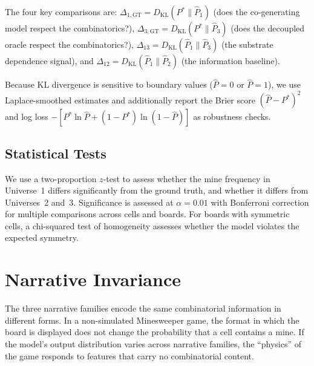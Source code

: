 \documentclass[12pt,a4paper]{article}
\begin{document}
The four key comparisons are: $\Delta_{1,\text{GT}} = D_{\mathrm{KL}}(P^* \| \hat{P}_1)$ (does the co-generating model respect the combinatorics?), $\Delta_{3,\text{GT}} = D_{\mathrm{KL}}(P^* \| \hat{P}_3)$ (does the decoupled oracle respect the combinatorics?), $\Delta_{13} = D_{\mathrm{KL}}(\hat{P}_1 \| \hat{P}_3)$ (the substrate dependence signal), and $\Delta_{12} = D_{\mathrm{KL}}(\hat{P}_1 \| \hat{P}_2)$ (the information baseline).

Because KL divergence is sensitive to boundary values ($\hat{P} = 0$ or $\hat{P} = 1$), we use Laplace-smoothed estimates and additionally report the Brier score $(\hat{P} - P^*)^2$ and log loss $-[P^* \ln \hat{P} + (1-P^*) \ln(1-\hat{P})]$ as robustness checks.

\subsection{Statistical Tests}
\label{sec:stats}

We use a two-proportion $z$-test to assess whether the mine frequency in Universe~1 differs significantly from the ground truth, and whether it differs from Universes~2 and~3. Significance is assessed at $\alpha = 0.01$ with Bonferroni correction for multiple comparisons across cells and boards. For boards with symmetric cells, a chi-squared test of homogeneity assesses whether the model violates the expected symmetry.

\section{Narrative Invariance}
\label{sec:narrative}

The three narrative families encode the same combinatorial information in different forms. In a non-simulated Minesweeper game, the format in which the board is displayed does not change the probability that a cell contains a mine. If the model's output distribution varies across narrative families, the ``physics'' of the game responds to features that carry no combinatorial content.
\end{document}
